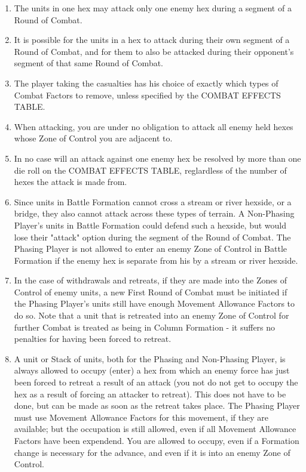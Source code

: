 \begin{enumerate}
  \item The units in one hex may attack only one enemy hex during a segment of a Round of Combat.

  \item It is possible for the units in a hex to attack during their own segment of a Round of Combat, and for them to also be attacked during their opponent's segment of that same Round of Combat.

  \item The player taking the casualties has his choice of exactly which types of Combat Factors to remove, unless specified by the COMBAT EFFECTS TABLE.

  \item When attacking, you are under no obligation to attack all enemy held hexes whose Zone of Control you are adjacent to.

  \item In no case will an attack against one enemy hex be resolved by more than one die roll on the COMBAT EFFECTS TABLE, reglardless of the number of hexes the attack is made from.

  \item Since units in Battle Formation cannot cross a stream or river hexside, or a bridge, they also cannot attack across these types of terrain. A Non-Phasing Player's units in Battle Formation could defend such a hexside, but would lose their "attack" option during the segment of the Round of Combat. The Phasing Player is not allowed to enter an enemy Zone of Control in Battle Formation if the enemy hex is separate from his by a stream or river hexside.

  \item In the case of withdrawals and retreats, if they are made into the Zones of Control of enemy units, a new First Round of Combat must be initiated if the Phasing Player's units still have enough Movement Allowance Factors to do so. Note that a unit that is retreated into an enemy Zone of Control for further Combat is treated as being in Column Formation - it suffers no penalties for having been forced to retreat.

  \item A unit or Stack of units, both for the Phasing and Non-Phasing Player, is always allowed to occupy (enter) a hex from which an enemy force has just been forced to retreat a result of an attack (you not do not get to occupy the hex as a result of forcing an attacker to retreat). This does not have to be done, but can be made as soon as the retreat takes place. The Phasing Player must use Movement Allowance Factors for this movement, if they are available; but the occupation is still allowed, even if all Movement Allowance Factors have been expendend. You are allowed to occupy, even if a Formation change is necessary for the advance, and even if it is into an enemy Zone of Control.
\end{enumerate}

